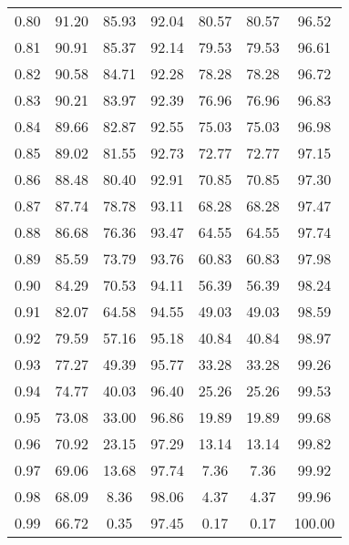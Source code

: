 \begin{tabular}{|c|c|c|c|c|c|c|}
      0.80 &     91.20 &     85.93 &      92.04 &   80.57 &      80.57 &         96.52 \\
      0.81 &     90.91 &     85.37 &      92.14 &   79.53 &      79.53 &         96.61 \\
      0.82 &     90.58 &     84.71 &      92.28 &   78.28 &      78.28 &         96.72 \\
      0.83 &     90.21 &     83.97 &      92.39 &   76.96 &      76.96 &         96.83 \\
      0.84 &     89.66 &     82.87 &      92.55 &   75.03 &      75.03 &         96.98 \\
      0.85 &     89.02 &     81.55 &      92.73 &   72.77 &      72.77 &         97.15 \\
      0.86 &     88.48 &     80.40 &      92.91 &   70.85 &      70.85 &         97.30 \\
      0.87 &     87.74 &     78.78 &      93.11 &   68.28 &      68.28 &         97.47 \\
      0.88 &     86.68 &     76.36 &      93.47 &   64.55 &      64.55 &         97.74 \\
      0.89 &     85.59 &     73.79 &      93.76 &   60.83 &      60.83 &         97.98 \\
      0.90 &     84.29 &     70.53 &      94.11 &   56.39 &      56.39 &         98.24 \\
      0.91 &     82.07 &     64.58 &      94.55 &   49.03 &      49.03 &         98.59 \\
      0.92 &     79.59 &     57.16 &      95.18 &   40.84 &      40.84 &         98.97 \\
      0.93 &     77.27 &     49.39 &      95.77 &   33.28 &      33.28 &         99.26 \\
      0.94 &     74.77 &     40.03 &      96.40 &   25.26 &      25.26 &         99.53 \\
      0.95 &     73.08 &     33.00 &      96.86 &   19.89 &      19.89 &         99.68 \\
      0.96 &     70.92 &     23.15 &      97.29 &   13.14 &      13.14 &         99.82 \\
      0.97 &     69.06 &     13.68 &      97.74 &    7.36 &       7.36 &         99.92 \\
      0.98 &     68.09 &      8.36 &      98.06 &    4.37 &       4.37 &         99.96 \\
      0.99 &     66.72 &      0.35 &      97.45 &    0.17 &       0.17 &        100.00 \\
\bottomrule
\end{tabular}
